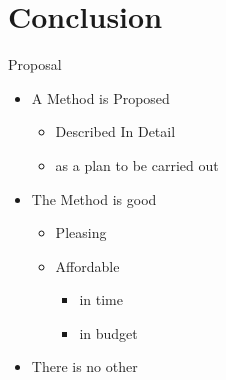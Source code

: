 \documentclass[12pt,landscape,english]{beamer}
\begin{document}
\section{Conclusion}
\begin{frame}{Proposal}
	\begin{itemize}
		\item A Method is Proposed
		\begin{itemize}
			\item Described In Detail
			\item as a plan to be carried out
		\end{itemize}
		\item The Method is good
		\begin{itemize}
			\item Pleasing
			\item Affordable
			\begin{itemize}
				\item in time
				\item in budget 
			\end{itemize}
		\end{itemize}
		\item There is no other
	\end{itemize}

\end{frame}
\end{document}
